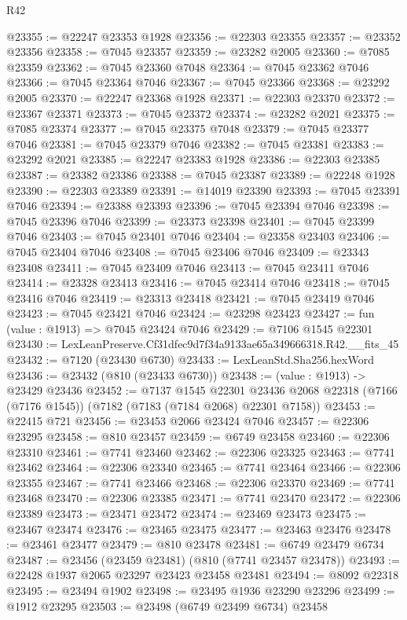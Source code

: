 \begin{lexlean}{R42}
\begin{coremodule}
{@23355 := @22247 @23353 @1928
@23356 := @22303 @23355
@23357 := @23352 @23356
@23358 := @7045 @23357
@23359 := @23282 @2005
@23360 := @7085 @23359
@23362 := @7045 @23360 @7048
@23364 := @7045 @23362 @7046
@23366 := @7045 @23364 @7046
@23367 := @7045 @23366
@23368 := @23292 @2005
@23370 := @22247 @23368 @1928
@23371 := @22303 @23370
@23372 := @23367 @23371
@23373 := @7045 @23372
@23374 := @23282 @2021
@23375 := @7085 @23374
@23377 := @7045 @23375 @7048
@23379 := @7045 @23377 @7046
@23381 := @7045 @23379 @7046
@23382 := @7045 @23381
@23383 := @23292 @2021
@23385 := @22247 @23383 @1928
@23386 := @22303 @23385
@23387 := @23382 @23386
@23388 := @7045 @23387
@23389 := @22248 @1928
@23390 := @22303 @23389
@23391 := @14019 @23390
@23393 := @7045 @23391 @7046
@23394 := @23388 @23393
@23396 := @7045 @23394 @7046
@23398 := @7045 @23396 @7046
@23399 := @23373 @23398
@23401 := @7045 @23399 @7046
@23403 := @7045 @23401 @7046
@23404 := @23358 @23403
@23406 := @7045 @23404 @7046
@23408 := @7045 @23406 @7046
@23409 := @23343 @23408
@23411 := @7045 @23409 @7046
@23413 := @7045 @23411 @7046
@23414 := @23328 @23413
@23416 := @7045 @23414 @7046
@23418 := @7045 @23416 @7046
@23419 := @23313 @23418
@23421 := @7045 @23419 @7046
@23423 := @7045 @23421 @7046
@23424 := @23298 @23423
@23427 := fun (value : @1913) => @7045 @23424 @7046
@23429 := @7106 @1545 @22301
@23430 := LexLeanPreserve.Cf31dfec9d7f34a9133ae65a349666318.R42.__fits_45
@23432 := @7120 (@23430 @6730)
@23433 := LexLeanStd.Sha256.hexWord
@23436 := @23432 (@810 (@23433 @6730))
@23438 := (value : @1913) -> @23429 @23436
@23452 := @7137
    @1545
    @22301
    @23436
    @2068
    @22318
    (@7166 (@7176 @1545))
    (@7182 (@7183 (@7184 @2068) @22301 @7158))
@23453 := @22415 @721
@23456 := @23453 @2066 @23424 @7046
@23457 := @22306 @23295
@23458 := @810 @23457
@23459 := @6749 @23458
@23460 := @22306 @23310
@23461 := @7741 @23460
@23462 := @22306 @23325
@23463 := @7741 @23462
@23464 := @22306 @23340
@23465 := @7741 @23464
@23466 := @22306 @23355
@23467 := @7741 @23466
@23468 := @22306 @23370
@23469 := @7741 @23468
@23470 := @22306 @23385
@23471 := @7741 @23470
@23472 := @22306 @23389
@23473 := @23471 @23472
@23474 := @23469 @23473
@23475 := @23467 @23474
@23476 := @23465 @23475
@23477 := @23463 @23476
@23478 := @23461 @23477
@23479 := @810 @23478
@23481 := @6749 @23479 @6734
@23487 := @23456 (@23459 @23481) (@810 (@7741 @23457 @23478))
@23493 := @22428 @1937 @2065 @23297 @23423 @23458 @23481
@23494 := @8092 @22318
@23495 := @23494 @1902
@23498 := @23495 @1936 @23290 @23296
@23499 := @1912 @23295
@23503 := @23498 (@6749 @23499 @6734) @23458
}
\end{coremodule}
\end{lexlean}
